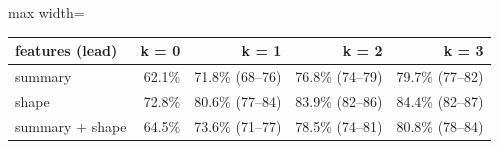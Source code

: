 \begin{adjustbox}{max width=\textwidth}
{\footnotesize
\begin{tabular}{lrrrr}
\toprule
\textbf{features (lead)} & \textbf{k = 0} & \textbf{k = 1} & \textbf{k = 2} & \textbf{k = 3} \\
\midrule
summary & 62.1\% & 71.8\% (68--76) & 76.8\% (74--79) & 79.7\% (77--82) \\
shape & 72.8\% & 80.6\% (77--84) & 83.9\% (82--86) & 84.4\% (82--87) \\
summary + shape & 64.5\% & 73.6\% (71--77) & 78.5\% (74--81) & 80.8\% (78--84) \\
\bottomrule
\end{tabular}
}
\end{adjustbox}
